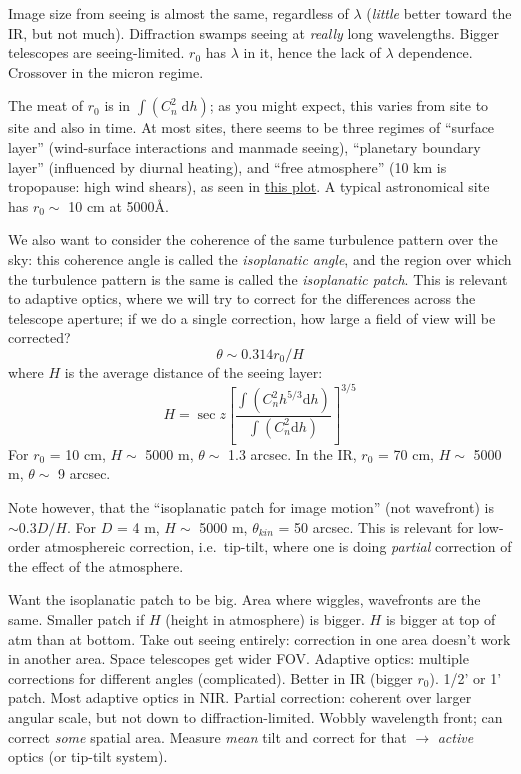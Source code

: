 \documentclass[12pt]{article}
\newcommand{\mynotes}[1]{\textcolor{myBlue}{#1}}
\newcommand{\dd}{\;\mathrm{d}}
\begin{document}
\mynotes{Image size from seeing is almost the same, regardless of $\lambda$
(\emph{little} better toward the IR, but not much). Diffraction swamps seeing
at \emph{really} long wavelengths. Bigger telescopes are seeing-limited.
$r_{0}$ has $\lambda$ in it, hence the lack of $\lambda$ dependence. Crossover
in the micron regime.}

The meat of $r_{0}$ is in $\int\left(C_{n}^{2}\dd{h} \right)$;
as you might expect, this varies from site to site and also in time.
At most sites, there seems to be three regimes of ``surface layer''
(wind-surface interactions and manmade seeing),
``planetary boundary layer'' (influenced by diurnal heating), and
``free atmosphere'' (10 km is tropopause: high wind shears),
as seen in \href{http://astronomy.nmsu.edu/holtz/a535/html/diagrams/a535/beckers2.htm}
{this plot}. A typical astronomical site has $r_{0} \sim$ 10 cm at 5000\AA{}.

We also want to consider the coherence of the same turbulence pattern over the
sky: this coherence angle is called the \textit{isoplanatic angle}, and the
region over which the turbulence pattern is the same is called the
\textit{isoplanatic patch}. This is relevant to adaptive optics, where we will
try to correct for the differences across the telescope aperture; if we do a
single correction, how large a field of view will be corrected?
\[
    \theta \sim 0.314r_{0}/H
    \]
where $H$ is the average distance of the seeing layer:
\[
    H = \sec z \left[ \frac{\int \left( C_{n}^{2}h^{5/3}\textrm{d}h\right)}
    {\int\left(C_{n}^{2}\textrm{d}h\right)}
    \right]^{3/5}
\]
For $r_{0}$ = 10 cm, $H \sim$ 5000 m, $\theta \sim$ 1.3 arcsec.
In the IR, $r_{0}$ = 70 cm, $H \sim$ 5000 m, $\theta \sim$ 9 arcsec.

Note however, that the ``isoplanatic patch for image motion'' (not wavefront)
is $\sim 0.3 D/H$. For $D$ = 4 m, $H \sim$ 5000 m, $\theta_{kin}$ = 50 arcsec.
This is relevant for low-order atmosphereic correction, i.e.\ tip-tilt, where
one is doing \emph{partial} correction of the effect of the atmosphere.

\mynotes{Want the isoplanatic patch to be big. Area where wiggles, wavefronts
are the same. Smaller patch if $H$ (height in atmosphere) is bigger. $H$ is
bigger at top of atm than at bottom. Take out seeing entirely: correction in
one area doesn't work in another area. Space telescopes get wider FOV\@.
Adaptive optics: multiple corrections for different angles (complicated).
Better in IR (bigger $r_{0}$). 1/2' or 1' patch. Most adaptive optics in NIR\@.
Partial correction: coherent over larger angular scale, but not down to
diffraction-limited. Wobbly wavelength front; can correct \emph{some} spatial
area. Measure \emph{mean} tilt and correct for that $\rightarrow$ \emph{active}
optics (or tip-tilt system)}.
\end{document}
